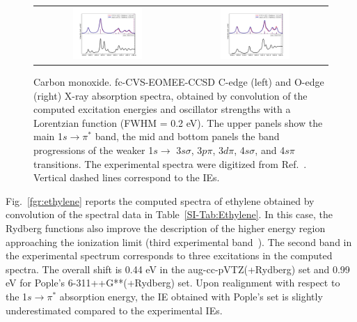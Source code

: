 \documentclass[journal=jctcce,manuscript=article]{achemso}
\begin{document}
\begin{figure}
\begin{tabular}{cc}
\hspace{-1cm}\includegraphics[width=0.50\textwidth]{Spectra/CO_C_2.pdf} &
\includegraphics[width=0.50\textwidth]{Spectra/CO_O_2_newshift.pdf}\\
%
\end{tabular}
\caption{Carbon monoxide. fc-CVS-EOMEE-CCSD
C-edge (left) and O-edge (right) X-ray absorption spectra, obtained by convolution of the computed excitation energies and oscillator strengths with a Lorentzian function (FWHM = 0.2 eV).
The upper panels show the main 1$s\to\pi^\ast$ band,
the mid and bottom panels the band progressions of the weaker 1$s\to$ 3$s\sigma$, 3$p\pi$, 3$d\pi$, 4$s\sigma$, and 4$s\pi$ transitions.
The experimental spectra were digitized from Ref.~.
Vertical dashed lines correspond to the IEs.
\label{fgr:co_both}
}
\end{figure}

\clearpage
Fig.~\ref{fgr:ethylene} reports the computed spectra of ethylene
obtained by convolution of the spectral data in Table~\ref{SI-Tab:Ethylene}. In this case, the Rydberg functions also improve the description of the higher energy region approaching the ionization limit (third experimental band~\cite{NEXAFS_C2H4_CH2CHF_Exp}). 
The second band in the experimental spectrum corresponds to three excitations in the computed spectra.
The overall shift is 0.44 eV in the aug-cc-pVTZ(+Rydberg) set and 0.99 eV for Pople's 6-311++G**(+Rydberg) set. Upon realignment
with respect to the 1$s\to \pi^\ast$ absorption energy, the IE obtained with Pople's set is slightly underestimated compared to the experimental IEs.
\end{document}
